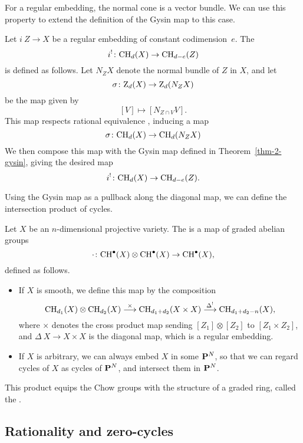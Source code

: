 For a regular embedding, the normal cone is a vector bundle.
We can use this property to extend the definition of the Gysin map
to this case.

\begin{definition}
    Let $i \: Z \to X$ be a regular embedding of constant codimension~$e$.
    The 
    \[ i^! \colon \mathrm{CH}_d (X) \to \mathrm{CH}_{d-e} (Z) \]
    is defined as follows.
    Let $N_Z X$ denote the normal bundle of $Z$ in $X$, and let
    \[ \sigma \colon \mathrm{Z}_d (X) \to \mathrm{Z}_d (N_Z X) \]
    be the map given by
    \[ [V] \mapsto [N_{Z \cap V} V]. \]
    This map respects rational equivalence \textup{\cite[\S5.2]{fulton}}, inducing a map
    \[ \sigma \colon \mathrm{CH}_d (X) \to \mathrm{CH}_d (N_Z X) \]
    We then compose this map with the Gysin map defined in Theorem~\textup{\ref{thm-2-gysin}},
    giving the desired map
    \[ i^! \colon \mathrm{CH}_d (X) \to \mathrm{CH}_{d-e} (Z). \]
\end{definition}

Using the Gysin map as a pullback along the diagonal map,
we can define the intersection product of cycles.

\begin{definition}
    Let $X$ be an $n$-dimensional projective variety.
    The  is a map of graded abelian groups
    \[ \cdot \colon \mathrm{CH}^\bullet (X) \otimes \mathrm{CH}^\bullet (X) \to \mathrm{CH}^\bullet (X), \]
    defined as follows.
    \begin{itemize}
        \item
            If $X$ is smooth, we define this map by the composition
            \[ \mathrm{CH}_{d_1} (X) \otimes \mathrm{CH}_{d_2} (X) 
                \overset{\times}{\longrightarrow} \mathrm{CH}_{d_1 + d_2} (X \times X) 
                \overset{\Delta^!}{\longrightarrow} \mathrm{CH}_{d_1 + d_2 - n} (X), \]
            where $\times$ denotes the cross product map sending $[Z_1] \otimes [Z_2]$ to $[Z_1 \times Z_2]$,
            and $\Delta \: X \to X \times X$ is the diagonal map, which is a regular embedding.
        \item
            If $X$ is arbitrary, we can always embed $X$ in some $\bbP^N$,
            so that we can regard cycles of $X$ as cycles of $\bbP^N$, 
            and intersect them in $\bbP^N$.
    \end{itemize}
\end{definition}

This product equips the Chow groups with the structure of a graded ring,
called the .


\subsection{Rationality and zero-cycles}

